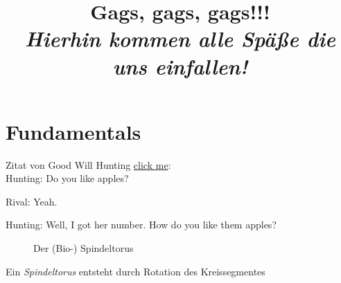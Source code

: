 \documentclass{article}
\title
{
  Gags, gags, gags!!! \\
  \vspace{4pt}
  \normalsize
  \textit{Hierhin kommen alle Späße die uns einfallen!}
}
\author{}
\date{}
\begin{document}
\maketitle

\section{Fundamentals}

Zitat von Good Will Hunting
\href{https://knowyourphrase.com/how-do-you-like-them-apples}{click me}: \\

Hunting: Do you like apples?

Rival: Yeah.

Hunting: Well, I got her number. How do you like them apples?

\begin{figure}[H]
\centering
{}
\hspace{0mm}
\caption{Der (Bio-) Spindeltorus}
\label{fig:apfel_apple}
\end{figure}

Ein \textit{Spindeltorus} entsteht durch Rotation des Kreissegmentes
\end{document}
